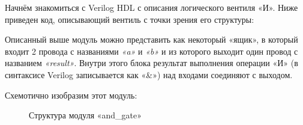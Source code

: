 \documentclass[a5paper, DIV=16, headings=openany, twoside=true,fontsize=10pt, titlepage]{scrreprt}
\newcommand{\quotes}[1]{«#1»}
\begin{document}
\par{Начнём знакомиться с \foreignlanguage{english}{Verilog HDL} с описания логического вентиля \quotes{И}. Ниже приведен код, описывающий вентиль с точки зрения его структуры:}


%




\par{Описанный выше модуль можно представить как некоторый \quotes{ящик}, в который входит 2 провода с названиями \emph{\quotes{a}} и \emph{\quotes{b}} и из которого выходит один провод с названием \emph{\quotes{result}}. Внутри этого блока результат выполнения операции \quotes{И} (в синтаксисе Verilog записывается как \quotes{\&}) над входами соединяют с выходом.}
\par{Схемотично изобразим этот модуль:}

\begin{figure}[H]
\centering
\def\svgwidth{\columnwidth}

\caption{Структура модуля \foreignlanguage{english}{\quotes{and\_gate}}}
\end{figure}
%






%
\end{document}
